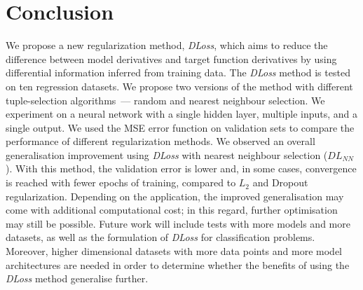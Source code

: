 \documentclass{article}
\begin{document}

\section{Conclusion}\label{sec:conclusion}
We propose a new regularization method, \emph{DLoss}, which aims to reduce the difference between model derivatives and  target function derivatives by using differential information inferred from training data.
The \emph{DLoss} method is tested on ten regression datasets.
We propose two versions of the method with different tuple-selection algorithms~--- random and nearest neighbour selection.
We experiment on a neural network with a single hidden layer, multiple inputs, and a single output. 
We used the MSE error function on validation sets to compare the performance of different regularization methods. 
We observed an overall generalisation improvement using \emph{DLoss} with nearest neighbour selection ($DL_{NN}$). 
With this method, the validation error is lower and, in some cases, convergence is reached with fewer epochs of training, compared to $L_2$ and Dropout regularization.
Depending on the application, the improved generalisation may come with additional computational cost; in this regard, further optimisation may still be possible. 
Future work will include tests with more models and more datasets, as well as the formulation of \emph{DLoss} for classification problems.
Moreover, higher dimensional datasets with more data points and more model architectures are needed in order to determine whether the benefits of using the \emph{DLoss} method generalise further. 


 
 

\newpage
\appendix
\onecolumn
\end{document}
